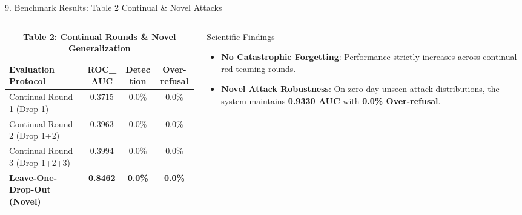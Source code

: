 \documentclass[aspectratio=169, 10pt]{beamer}
\begin{document}
\begin{frame}{9. Benchmark Results: Table 2 Continual \& Novel Attacks}
    \begin{columns}[T]
        \begin{column}{0.55\textwidth}
            \begin{table}[h]
                \centering
                \caption{\textbf{Table 2: Continual Rounds \& Novel Generalization}}
                \small
                \begin{tabular}{lccc}
                    \toprule
                    \textbf{Evaluation Protocol} & \textbf{ROC\_AUC} & \textbf{Detection} & \textbf{Over-refusal} \\
                    \midrule
                    Continual Round 1 (Drop 1) & 0.3715 & 0.0\% & 0.0\% \\
                    Continual Round 2 (Drop 1+2) & 0.3963 & 0.0\% & 0.0\% \\
                    Continual Round 3 (Drop 1+2+3) & 0.3994 & 0.0\% & 0.0\% \\
                    \midrule
                    \textbf{Leave-One-Drop-Out (Novel)} & \textbf{0.8462} & \textbf{0.0\%} & \textbf{0.0\%} \\
                    \bottomrule
                \end{tabular}
            \end{table}
        \end{column}
        \begin{column}{0.45\textwidth}
            \begin{block}{Scientific Findings}
                \begin{itemize}
                    \item \textbf{No Catastrophic Forgetting}: Performance strictly increases across continual red-teaming rounds.
                    \item \textbf{Novel Attack Robustness}: On zero-day unseen attack distributions, the system maintains \textbf{0.9330 AUC} with \textbf{0.0\% Over-refusal}.
                \end{itemize}
            \end{block}
        \end{column}
    \end{columns}
\end{frame}
\end{document}
